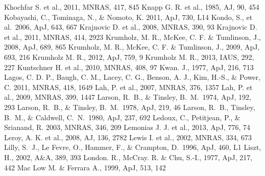 \begin{thebibliography}{99}
\begin{multicols}{2}
{
	Khochfar S. et al., 2011, MNRAS, 417, 845
	Knapp G. R. et al., 1985, AJ, 90, 454
   	Kobayashi, C., Tominaga, N., \& Nomoto, K. 2011, ApJ, 730, L14
   	Kondo, S., et al.\ 2006, ApJ, 643, 667
	Krajnovic D. et al., 2008, MNRAS, 390, 93
	Krajnovic D. et al., 2011, MNRAS, 414, 2923
	Krumholz, M. R., McKee, C. F. \& Tumlinson, J., 2008, ApJ, 689, 865
	Krumholz, M. R., McKee, C. F. \& Tumlinson, J., 2009, ApJ, 693, 216
	Krumholz M. R., 2012, ApJ, 759, 9
        Krumholz M. R., 2013, IAUS, 292, 227
	Kuntschner H. et al., 2010, MNRAS, 408, 97
	Kwan. J., 1977, ApJ, 216, 713
    	Lagos, C. D. P., Baugh, C. M., Lacey, C. G., Benson, A. J., Kim, H.-S.,
    \& Power, C. 2011, MNRAS, 418, 1649
	Lah, P. et al., 2007, MNRAS, 376, 1357
	Lah, P. et al., 2009, MNRAS, 399, 1447
	Larson, R.~B., \& Tinsley, B.~M.\ 1974, ApJ, 192, 293 
	Larson, R.~B., \& Tinsley, B.~M.\ 1978, ApJ, 219, 46 
	Larson, R.~B., Tinsley, B.~M., \& Caldwell, C.~N.\ 1980, ApJ, 237, 692 
	Ledoux, C., Petitjean, P., \& Srianand, R. 2003, MNRAS, 346, 209
	Lemonias J. J. et al., 2013, ApJ, 776, 74
	Leroy, A. K. et al., 2008, AJ, 136, 2782
	Lewis I. et al., 2002, MNRAS, 334, 673
	Lilly, S.~J., Le Fevre, O., Hammer, F., \& Crampton, D.\ 1996, ApJ, 460, L1
      Liszt, H., 2002, A\&A, 389, 393
	London. R., McCray. R. \& Chu, S.-I., 1977, ApJ, 217, 442
	Mac Low M. \& Ferrara A., 1999, ApJ, 513, 142
}
\end{multicols}
\end{thebibliography}
